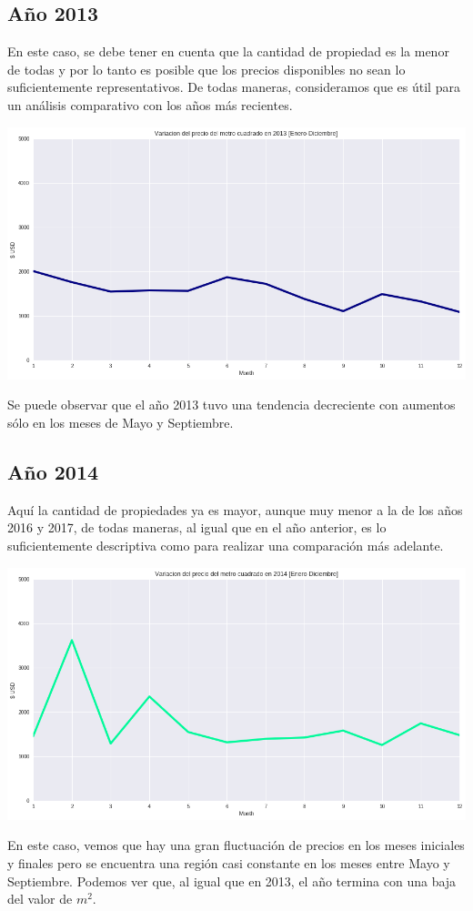 \documentclass[a4paper, 10pt]{article}
\newcommand\tab[1][0.5cm]{\hspace*{#1}}
\begin{document}
			\subsection{Año 2013}
				En este caso, se debe tener en cuenta que la cantidad de propiedad es la menor de todas y por lo tanto es posible
				que los precios disponibles no sean lo suficientemente representativos. De todas maneras, consideramos que es útil
				para un análisis comparativo con los años más recientes.
				\begin{center}
					\includegraphics[width=\textwidth]{images/m2Progression2013}
				\end{center}
				\tab Se puede observar que el año 2013 tuvo una tendencia decreciente con aumentos sólo en los meses de Mayo
				y Septiembre.
			\subsection{Año 2014}
				Aquí la cantidad de propiedades ya es mayor, aunque muy menor a la de los años 2016 y 2017, de todas maneras, al
				igual que en el año anterior, es lo suficientemente descriptiva como para realizar una comparación más adelante.
				\begin{center}
					\includegraphics[width=\textwidth]{images/m2Progression2014}
				\end{center}
				\tab En este caso, vemos que hay una gran fluctuación de precios en los meses iniciales y finales pero se
				encuentra una región casi constante en los meses entre Mayo y Septiembre.  Podemos ver que, al igual que en 2013,
				el año termina con una baja del valor de $m^2$.
\end{document}
